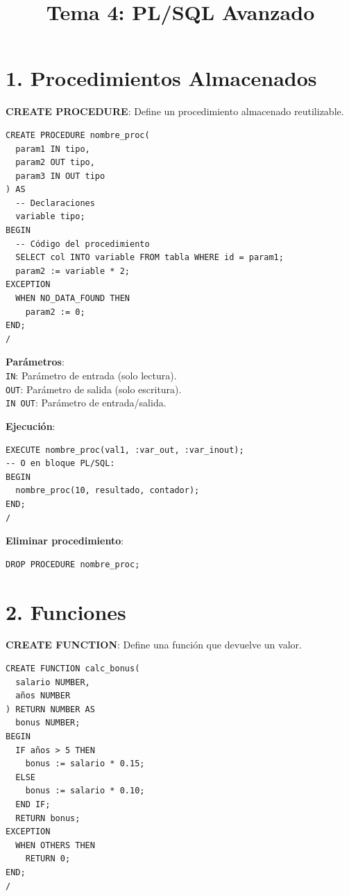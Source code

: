 \documentclass[8pt,a4paper,twocolumn]{article}
\title{\textbf{Tema 4: PL/SQL Avanzado}}
\author{}
\date{}
\begin{document}
\tiny

\maketitle

\section*{1. Procedimientos Almacenados}

\textbf{CREATE PROCEDURE}: Define un procedimiento almacenado reutilizable.

\begin{lstlisting}
CREATE PROCEDURE nombre_proc(
  param1 IN tipo,
  param2 OUT tipo,
  param3 IN OUT tipo
) AS
  -- Declaraciones
  variable tipo;
BEGIN
  -- Código del procedimiento
  SELECT col INTO variable FROM tabla WHERE id = param1;
  param2 := variable * 2;
EXCEPTION
  WHEN NO_DATA_FOUND THEN
    param2 := 0;
END;
/
\end{lstlisting}

\textbf{Parámetros}:\\
\texttt{IN}: Parámetro de entrada (solo lectura).\\
\texttt{OUT}: Parámetro de salida (solo escritura).\\
\texttt{IN OUT}: Parámetro de entrada/salida.

\textbf{Ejecución}:
\begin{lstlisting}
EXECUTE nombre_proc(val1, :var_out, :var_inout);
-- O en bloque PL/SQL:
BEGIN
  nombre_proc(10, resultado, contador);
END;
/
\end{lstlisting}

\textbf{Eliminar procedimiento}:
\begin{lstlisting}
DROP PROCEDURE nombre_proc;
\end{lstlisting}

\section*{2. Funciones}

\textbf{CREATE FUNCTION}: Define una función que devuelve un valor.

\begin{lstlisting}
CREATE FUNCTION calc_bonus(
  salario NUMBER,
  años NUMBER
) RETURN NUMBER AS
  bonus NUMBER;
BEGIN
  IF años > 5 THEN
    bonus := salario * 0.15;
  ELSE
    bonus := salario * 0.10;
  END IF;
  RETURN bonus;
EXCEPTION
  WHEN OTHERS THEN
    RETURN 0;
END;
/
\end{lstlisting}
\end{document}
